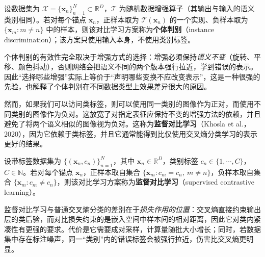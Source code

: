 \documentclass[../../main.tex]{subfiles}
\begin{document}
\begin{definition}[个体判别]\label{definition:ch06-个体判别}
设数据集为 $\mathcal{X}=\{\boldsymbol{x}_{n}\}_{n=1}^{N}\subset\mathbb{R}^{D}$，$\mathcal{T}$ 为随机数据增强算子（其输出与输入的语义类别相同）。若对每个锚点 $\boldsymbol{x}_{n}$，正样本取为 $\mathcal{T}(\boldsymbol{x}_{n})$ 的一个实现、负样本取为 $\{\boldsymbol{x}_{m}:m\neq n\}$ 中的样本，则该对比学习方案称为\textbf{个体判别}（instance discrimination）；该方案只使用输入本身，不使用类别标签。
\end{definition}

\begin{remark}个体判别的有效性完全取决于增强方式的选择：增强必须保持\emph{语义不变}（旋转、平移、颜色抖动），否则网络会把语义不同的两个版本强行拉近，学到错误的表示。因此“选择哪些增强”实际上等价于“声明哪些变换不应改变表示”，这是一种很强的先验，也解释了个体判别在不同数据类型上效果差异很大的原因。
\end{remark}

然而，如果我们可以访问类标签，则可以使用同一类别的图像作为正对，而使用不同类别的图像作为负对。这放宽了对指定表征应保持不变的增强方法的依赖，并且避免了将两个语义相似的图像视为负对。这称为\textbf{监督对比学习}（Khosla et al.，2020），因为它依赖于类标签，并且它通常能得到比仅使用交叉熵分类学习的表示更好的结果。

\begin{definition}[监督对比学习]\label{definition:ch06-监督对比学习}
设带标签数据集为 $\{(\boldsymbol{x}_{n},c_{n})\}_{n=1}^{N}$，其中 $\boldsymbol{x}_{n}\in\mathbb{R}^{D}$，类别标签 $c_{n}\in\{1,\cdots,C\}$，$C\in\mathbb{N}$。若对每个锚点 $\boldsymbol{x}_{n}$，正样本取自集合 $\{\boldsymbol{x}_{m}:c_{m}=c_{n},\ m\neq n\}$，负样本取自集合 $\{\boldsymbol{x}_{m}:c_{m}\neq c_{n}\}$，则该对比学习方案称为\textbf{监督对比学习}（supervised contrastive learning）。
\end{definition}

\begin{remark}监督对比学习与普通交叉熵分类的差别在于\emph{损失作用的位置}：交叉熵直接约束输出层的类后验，而对比损失约束的是嵌入空间中样本间的相对距离，因此它对类内紧凑性有更强的要求。代价是它需要成对采样，计算量随批大小增长；同时，若数据集中存在标注噪声，同一“类别”内的错误标签会被强行拉近，伤害比交叉熵更明显。
\end{remark}
\end{document}
